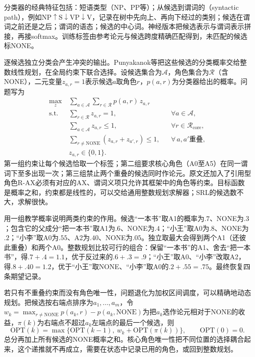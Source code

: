 分类器的经典特征包括：短语类型（NP、PP等）；从候选到谓词的（syntactic path），例如$\mathrm{NP}\uparrow\mathrm S\downarrow\mathrm{VP}\downarrow\mathrm V$，记录在树中先向上、再向下经过的类别；候选在谓词之前还是之后；谓词的语态；候选的中心词。神经版本把候选表示与谓词表示拼接，再接softmax。训练标签由参考论元与候选跨度精确匹配得到，未匹配的候选标NONE。

逐候选独立分类会产生冲突的输出。Punyakanok等把这些候选的分类概率交给整数线性规划，在全局约束下联合选择。设候选集合为$\mathcal A$，角色集合为$\mathcal R$（含NONE），二元变量$z_{a,r}=1$表示候选$a$取角色$r$，$p(a,r)$为分类器给出的概率。问题写为
\begin{equation}
 \begin{aligned}
  \max_{z}\ &\sum_{a\in\mathcal A}\sum_{r\in\mathcal R}p(a,r)\,z_{a,r}\\
  \text{s.t.}\ &\textstyle\sum_{r\in\mathcal R}z_{a,r}=1,&&\forall a\in\mathcal A,\\
  &\textstyle\sum_{a\in\mathcal A}z_{a,r}\leq1,&&\forall r\in\mathcal R_{\mathrm{core}},\\
  &\textstyle\sum_{r\neq\mathrm{NONE}}(z_{a,r}+z_{a',r})\leq1,&&\forall\,a,a'\text{重叠},\\
  &z_{a,r}\in\{0,1\}.
 \end{aligned}
 \label{eq:nlp-analysis-srl-ilp}
\end{equation}
第一组约束让每个候选恰取一个标签；第二组要求核心角色（A0至A5）在同一谓词下至多出现一次；第三组禁止两个重叠的候选同时作论元。原文还加入了引用型角色R-AX必须有对应的AX、谓词义项只允许其框架中的角色等约束。目标函数是概率之和，约束都是线性的，可以交给通用整数规划求解器；SRL的候选数不大，求解很快。

用一组教学概率说明两类约束的作用。候选“一本书”取A1的概率为$.7$、NONE为$.3$；包含它的父成分“把一本书”取A1为$.6$、NONE为$.4$；“小王”取A0为$.8$、NONE为$.2$；“小李”取A0为$.55$、A2为$.40$、NONE为$.05$。独立取最大会得到两个A1（还彼此重叠）和两个A0。整数规划比较可行的组合：保留“一本书”的A1、舍去“把一本书”，得$.7+.4=1.1$，优于反过来的$.6+.3=.9$；“小王”取A0、“小李”改取A2，得$.8+.40=1.2$，优于“小王”取NONE、“小李”取A0的$.2+.55=.75$。最终恢复四条期望记录。

若只有不重叠约束而没有角色唯一性，问题退化为加权区间调度，可以精确地动态规划。把候选按右端点排序为$a_1,\ldots,a_m$，令$w_k=\max_{r\neq\mathrm{NONE}}p(a_k,r)-p(a_k,\mathrm{NONE})$为把$a_k$选作论元相对于NONE的收益，$\pi(k)$为右端点不超过$a_k$左端点的最后一个候选，则
\[
 \mathrm{OPT}(k)=\max\{\mathrm{OPT}(k-1),\ w_k+\mathrm{OPT}(\pi(k))\},\qquad\mathrm{OPT}(0)=0.
\]
总分再加上所有候选的NONE概率之和。核心角色唯一性把不同位置的选择耦合起来，这个递推就不再成立，需要在状态中记录已用的角色，或回到整数规划。


